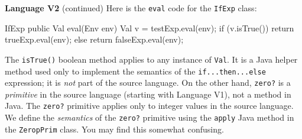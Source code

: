 \begin{minipage}[t]{\sw}
\slidenumber
\LARGE
{\bf Language V2} (continued)\exx
{\Large
{}\exx
}
Here is the \verb'eval' code for the \verb'IfExp' class:
{\Large
\begin{qv}
IfExp
    public Val eval(Env env) {
        Val v = testExp.eval(env);
        if (v.isTrue())
            return trueExp.eval(env);
        else
            return falseExp.eval(env);
    }
\end{qv}
}
The \verb'isTrue()' boolean method applies
to any instance of \verb'Val'.
It is a Java helper method used only
to implement the semantics of the \verb'if...then...else' expression;
it is {\em not} part of the source language.
On the other hand, \verb'zero?' is a {\em primitive}
in the source language (starting with Language V1),
not a method in Java.
The \verb'zero?' primitive applies only to integer values
in the source language.
We define the {\em semantics} of the \verb'zero?' primitive
using the \verb'apply' Java method in the \verb'ZeropPrim' class.
You may find this somewhat confusing.
\end{minipage}
\clearpage
